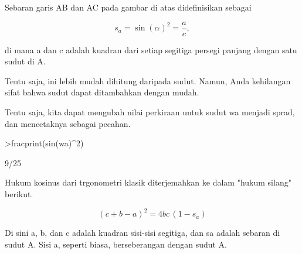 \documentclass[a4paper,10pt]{article}
\begin{document}
\begin{eulernotebook}
\begin{eulercomment}
\begin{eulercomment}
\begin{eulercomment}
\begin{eulercomment}
\begin{eulercomment}
\begin{eulercomment}
\begin{eulercomment}
\begin{eulercomment}
\begin{eulercomment}
\begin{eulercomment}
\begin{eulercomment}
\begin{eulercomment}
\begin{eulercomment}
\begin{eulercomment}
\begin{eulercomment}
\begin{eulercomment}
\begin{eulercomment}
\begin{eulercomment}
\begin{eulercomment}
\begin{eulercomment}
\begin{eulercomment}
\begin{eulercomment}
\begin{eulercomment}
\begin{eulercomment}
\begin{eulercomment}
\begin{eulercomment}
\begin{eulercomment}
\begin{eulercomment}
\begin{eulercomment}
\begin{eulercomment}
\begin{eulercomment}
Sebaran garis AB dan AC pada gambar di atas didefinisikan sebagai

\end{eulercomment}
\begin{eulerformula}
\[
s_a = \sin(\alpha)^2 = \frac{a}{c},
\]
\end{eulerformula}
\begin{eulercomment}
di mana a dan c adalah kuadran dari setiap segitiga persegi panjang
dengan satu sudut di A.
\end{eulercomment}
\begin{eulercomment}
Tentu saja, ini lebih mudah dihitung daripada sudut. Namun, Anda
kehilangan sifat bahwa sudut dapat ditambahkan dengan mudah.

Tentu saja, kita dapat mengubah nilai perkiraan untuk sudut wa menjadi
sprad, dan mencetaknya sebagai pecahan.
\end{eulercomment}
\begin{eulerprompt}
>fracprint(sin(wa)^2)
\end{eulerprompt}
\begin{euleroutput}
  9/25
\end{euleroutput}
\begin{eulercomment}
Hukum kosinus dari trgonometri klasik diterjemahkan ke dalam "hukum
silang" berikut.

\end{eulercomment}
\begin{eulerformula}
\[
(c+b-a)^2 = 4 b c \, (1-s_a)
\]
\end{eulerformula}
\begin{eulercomment}
Di sini a, b, dan c adalah kuadran sisi-sisi segitiga, dan sa adalah
sebaran di sudut A. Sisi a, seperti biasa, berseberangan dengan sudut
A.


\end{eulercomment}
\end{eulercomment}
\end{eulercomment}
\end{eulercomment}
\end{eulercomment}
\end{eulercomment}
\end{eulercomment}
\end{eulercomment}
\end{eulercomment}
\end{eulercomment}
\end{eulercomment}
\end{eulercomment}
\end{eulercomment}
\end{eulercomment}
\end{eulercomment}
\end{eulercomment}
\end{eulercomment}
\end{eulercomment}
\end{eulercomment}
\end{eulercomment}
\end{eulercomment}
\end{eulercomment}
\end{eulercomment}
\end{eulercomment}
\end{eulercomment}
\end{eulercomment}
\end{eulercomment}
\end{eulercomment}
\end{eulercomment}
\end{eulercomment}
\end{eulercomment}
\end{eulernotebook}
\end{document}
